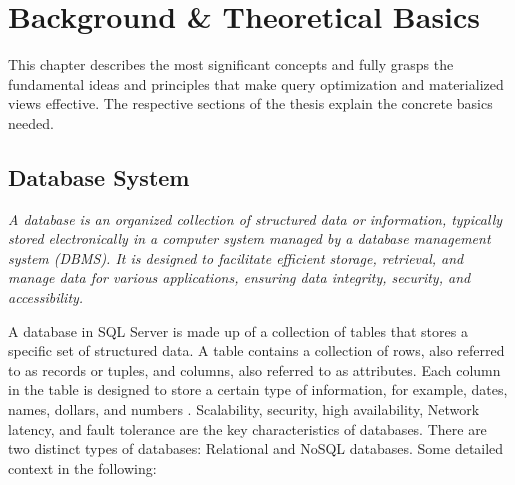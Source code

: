 \section{Background \& Theoretical Basics }

This chapter describes the most significant concepts and fully grasps the fundamental ideas and principles that make query optimization and materialized views effective. The respective sections of the thesis explain the concrete basics needed.

\subsection{ Database System}
\noindent\textit{A database is an organized collection of structured data or information, typically stored electronically in a computer system managed by a database management system (DBMS). It is designed to facilitate efficient storage, retrieval, and manage data for various applications, ensuring data integrity, security, and accessibility.}\vspace{.4cm}

A database in SQL Server is made up of a collection of tables that stores a specific set of structured data. A table contains a collection of rows, also referred to as records or tuples, and columns, also referred to as attributes. Each column in the table is designed to store a certain type of information, for example, dates, names, dollars, and numbers \cite{williamdassafmsft-2024}. Scalability, security, high availability, Network latency, and fault tolerance are the key characteristics of databases. There are two distinct types of databases: Relational and NoSQL databases. Some detailed context in the following: 

